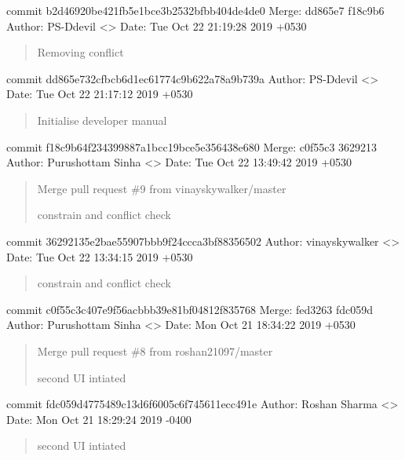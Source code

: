 \documentclass[letterpaper,10pt,english]{sphinxmanual}
\begin{document}
commit b2d46920be421fb5e1bce3b2532bfbb404de4de0
Merge: dd865e7 f18c9b6
Author: PS-Ddevil \textless{}\textgreater{}
Date:   Tue Oct 22 21:19:28 2019 +0530
\begin{quote}

Removing conflict
\end{quote}

commit dd865e732cfbcb6d1ec61774c9b622a78a9b739a
Author: PS-Ddevil \textless{}\textgreater{}
Date:   Tue Oct 22 21:17:12 2019 +0530
\begin{quote}

Initialise developer manual
\end{quote}

commit f18c9b64f234399887a1bcc19bce5e356438e680
Merge: c0f55c3 3629213
Author: Purushottam Sinha \textless{}\textgreater{}
Date:   Tue Oct 22 13:49:42 2019 +0530
\begin{quote}

Merge pull request \#9 from vinayskywalker/master

constrain and conflict check
\end{quote}

commit 36292135e2bae55907bbb9f24ccca3bf88356502
Author: vinayskywalker \textless{}\textgreater{}
Date:   Tue Oct 22 13:34:15 2019 +0530
\begin{quote}

constrain and conflict check
\end{quote}

commit c0f55c3c407e9f56acbbb39e81bf04812f835768
Merge: fed3263 fdc059d
Author: Purushottam Sinha \textless{}\textgreater{}
Date:   Mon Oct 21 18:34:22 2019 +0530
\begin{quote}

Merge pull request \#8 from roshan21097/master

second UI intiated
\end{quote}

commit fdc059d4775489c13d6f6005c6f745611ecc491e
Author: Roshan Sharma \textless{}\textgreater{}
Date:   Mon Oct 21 18:29:24 2019 -0400
\begin{quote}

second UI intiated
\end{quote}
\end{document}

